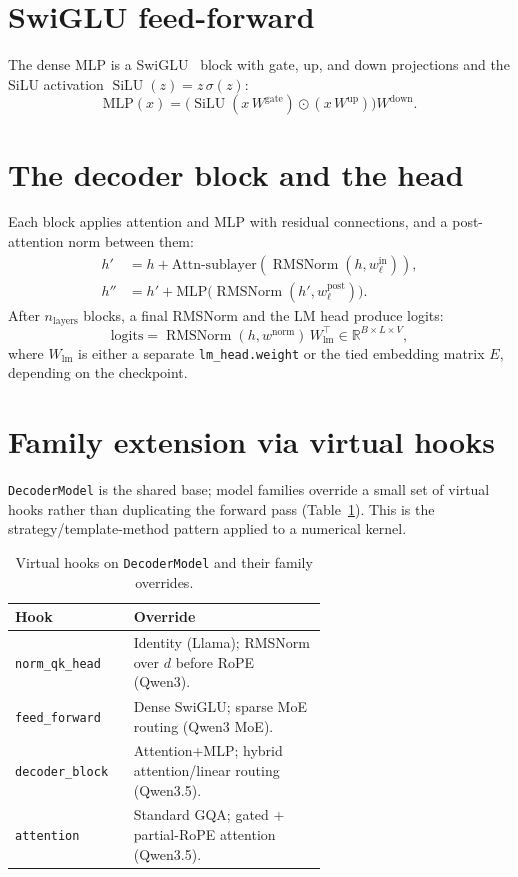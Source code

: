 \documentclass[11pt,a4paper]{report}
\newcommand{\R}{\mathbb{R}}
\newcommand{\code}[1]{\texttt{#1}}
\newcommand{\silu}{\operatorname{SiLU}}
\newcommand{\rmsnorm}{\operatorname{RMSNorm}}
\newcommand{\elemmul}{\odot}
\begin{document}
\section{SwiGLU feed-forward}
The dense MLP is a SwiGLU~\citep{shazeer2020glu} block with gate, up, and down
projections and the SiLU activation $\silu(z) = z\,\sigma(z)$:
\begin{equation}
  \text{MLP}(x) = \Big(\silu(x\,W^{\text{gate}}) \elemmul (x\,W^{\text{up}})\Big) W^{\text{down}}.
\end{equation}

\section{The decoder block and the head}
Each block applies attention and MLP with residual connections, and a post-attention
norm between them:
\begin{align}
  h' &= h + \text{Attn-sublayer}(\rmsnorm(h, w^{\text{in}}_\ell)),\\
  h'' &= h' + \text{MLP}\big(\rmsnorm(h', w^{\text{post}}_\ell)\big).
\end{align}
After $n_{\text{layers}}$ blocks, a final RMSNorm and the LM head produce logits:
\begin{equation}
  \text{logits} = \rmsnorm(h, w^{\text{norm}})\, W_{\text{lm}}^\top \in \R^{B\times L\times V},
\end{equation}
where $W_{\text{lm}}$ is either a separate \code{lm\_head.weight} or the tied
embedding matrix $E$, depending on the checkpoint.

\section{Family extension via virtual hooks}
\code{DecoderModel} is the shared base; model families override a small set of
virtual hooks rather than duplicating the forward pass
(Table~\ref{tab:hooks}). This is the strategy/template-method pattern applied to a
numerical kernel.

\begin{table}[h]
\centering
\caption{Virtual hooks on \code{DecoderModel} and their family overrides.}
\label{tab:hooks}
\small
\begin{tabular}{@{}l p{0.62\linewidth}@{}}
\toprule
Hook & Override \\
\midrule
\code{norm\_qk\_head} & Identity (Llama); RMSNorm over $d$ before RoPE (Qwen3). \\
\code{feed\_forward}  & Dense SwiGLU; sparse MoE routing (Qwen3 MoE). \\
\code{decoder\_block} & Attention+MLP; hybrid attention/linear routing (Qwen3.5). \\
\code{attention}      & Standard GQA; gated + partial-RoPE attention (Qwen3.5). \\
\bottomrule
\end{tabular}
\end{table}
\end{document}
